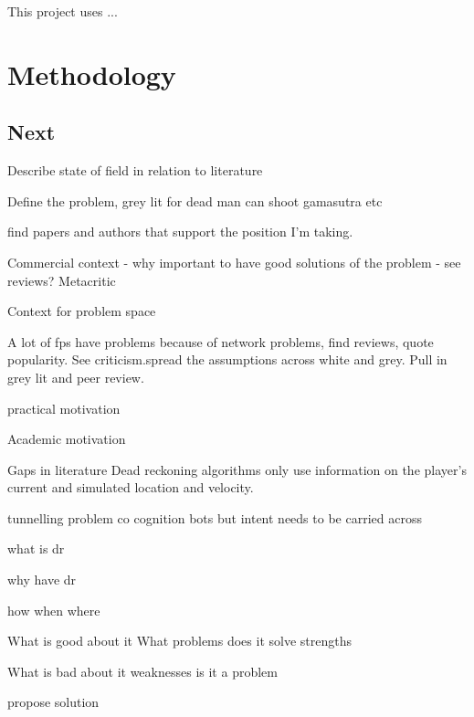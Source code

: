 \documentclass[journal]{IEEEtran}
\begin{document}
This project uses ...

\cite{bauckhage2014beyond}


\section{Methodology}




\subsection{Next}

Describe state of field in relation to literature

Define the problem, grey lit for dead man can shoot gamasutra etc

find papers and authors that support the position I'm taking.

Commercial context - why important to have good solutions of the problem - see reviews? Metacritic

Context for problem space

A lot of fps have problems because of network problems, find reviews, quote popularity. See criticism.spread the assumptions across white and grey. Pull in grey lit and peer review. \cite{solaire2016reddit} \cite{hp2015bungie}


practical motivation

Academic motivation

Gaps in literature
Dead reckoning algorithms only use information on the player's current and simulated location and velocity.

tunnelling problem
co cognition
bots but intent needs to be carried across



what is dr

why have dr

how when where

What is good about it 
What problems does it solve
strengths

What is bad about it
weaknesses
is it a problem

propose solution







\end{document}
